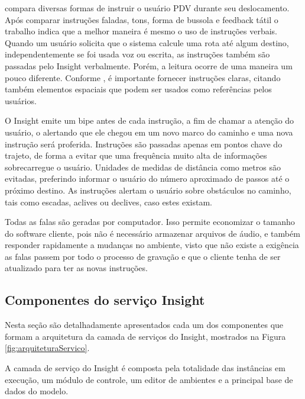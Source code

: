 \documentclass[english,brazilian]{UNISINOSmonografia}
\begin{document}
 compara diversas formas de instruir o usuário PDV durante seu deslocamento. Após comparar instruções faladas, tons, forma de bussola e feedback tátil o trabalho indica que a melhor maneira é mesmo o uso de instruções verbais. Quando um usuário solicita que o sistema calcule uma rota até algum destino, independentemente se foi usada voz ou escrita, as instruções também são passadas pelo Insight verbalmente. Porém, a leitura ocorre de uma maneira um pouco diferente. Conforme , é importante fornecer instruções claras, citando também elementos espaciais que podem ser usados como referências pelos usuários.

O Insight emite um bipe antes de cada instrução, a fim de chamar a atenção do usuário, o alertando que ele chegou em um novo marco do caminho e uma nova instrução será proferida. Instruções são passadas apenas em pontos chave do trajeto, de forma a evitar que uma frequência muito alta de informações sobrecarregue o usuário. Unidades de medidas de distância como metros são evitadas, preferindo informar o usuário do número aproximado de passos até o próximo destino. As instruções alertam o usuário sobre obstáculos no caminho, tais como escadas, aclives ou declives, caso estes existam.

Todas as falas são geradas por computador. Isso permite economizar o tamanho do software cliente, pois não é necessário armazenar arquivos de áudio, e também responder rapidamente a mudanças no ambiente, visto que não existe a exigência as falas passem por todo o processo de gravação e que o cliente tenha de ser atualizado para ter as novas instruções.	














	\subsection{Componentes do serviço Insight}
Nesta seção são detalhadamente apresentados cada um dos componentes que formam a arquitetura da camada de serviços do Insight, mostrados na Figura \ref{fig:arquiteturaServico}.

A camada de serviço do Insight é composta pela totalidade das instâncias em execução, um módulo de controle, um editor de ambientes e a principal base de dados do modelo. 
\end{document}
